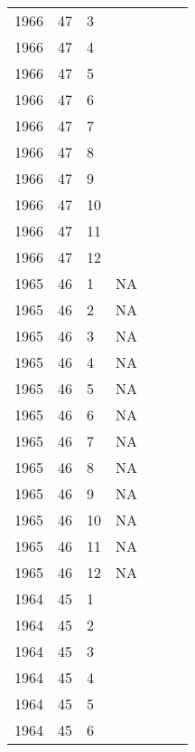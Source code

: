 \begin{longtable}{ |l|l|l|l|p{2.7cm}|l|p{2cm}| }
 1966 & 47 &     3 &         &                &  & \\
 1966 & 47 &     4 &         &                &  & \\
 1966 & 47 &     5 &         &                &  & \\
 1966 & 47 &     6 &         &                &  & \\
 1966 & 47 &     7 &         &                &  & \\
 1966 & 47 &     8 &         &                &  & \\
 1966 & 47 &     9 &         &                &  & \\
 1966 & 47 &    10 &         &                &  & \\
 1966 & 47 &    11 &         &                &  & \\
 1966 & 47 &    12 &         &                &  & \\
 1965 & 46 &     1 &      NA &                &  & \\
 1965 & 46 &     2 &      NA &                &  & \\
 1965 & 46 &     3 &      NA &                &  & \\
 1965 & 46 &     4 &      NA &                &  & \\
 1965 & 46 &     5 &      NA &                &  & \\
 1965 & 46 &     6 &      NA &                &  & \\
 1965 & 46 &     7 &      NA &                &  & \\
 1965 & 46 &     8 &      NA &                &  & \\
 1965 & 46 &     9 &      NA &                &  & \\
 1965 & 46 &    10 &      NA &                &  & \\
 1965 & 46 &    11 &      NA &                &  & \\
 1965 & 46 &    12 &      NA &                &  & \\
 1964 & 45 &     1 &         &                &  & \\
 1964 & 45 &     2 &         &                &  & \\
 1964 & 45 &     3 &         &                &  & \\
 1964 & 45 &     4 &         &                &  & \\
 1964 & 45 &     5 &         &                &  & \\
 1964 & 45 &     6 &         &                &  & \\

\end{longtable}
